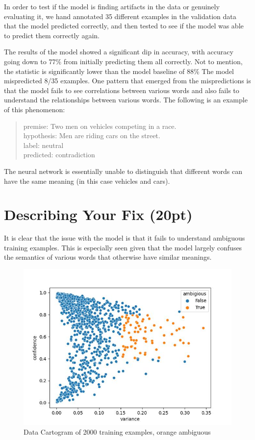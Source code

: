 \documentclass[twocolumn]{article}
\begin{document}
In order to test if the model is finding artifacts in the data or genuinely
evaluating it, we hand annotated 35 different examples in the validation data that
the model predicted correctly, and then tested to see if the model was able to
predict them correctly again.

The results of the model showed a significant dip in accuracy, with accuracy
going down to 77\% from initially predicting them all correctly. Not to mention,
the statistic is significantly lower than the model baseline of 88\% The model
mispredicted 8/35 examples. One pattern that emerged from the mispredictions is
that the model fails to see correlations between various words and also fails to
understand the relationships between various words. The following is an example
of this phenomenon: \\

\begin{quote}
premise: Two men on vehicles competing in a race. \\
hypothesis: Men are riding cars on the street. \\
label: neutral \\
predicted: contradiction
\end{quote}

The neural network is essentially unable to distinguish that different words can
have the same meaning (in this case vehicles and cars).

\section{Describing Your Fix (20pt)}

It is clear that the issue with the model is that it fails to understand
ambiguous training examples. This is especially seen given that the model
largely confuses the semantics of various words that otherwise have similar
meanings.


\begin{figure}
  \includegraphics[width=\linewidth]{./ambiguous.jpg}
  \caption{Data Cartogram of 2000 training examples, orange ambiguous}
  \label{}
\end{figure}
\end{document}
